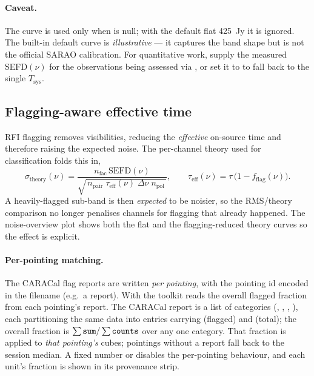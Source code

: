 \documentclass[11pt,a4paper]{article}
\begin{document}
\paragraph{Caveat.} The curve is used only when  is null; with the
default flat \SI{425}{Jy} it is ignored. The built-in default curve is \emph{illustrative} ---
it captures the band shape but is not the official SARAO calibration. For
quantitative work, supply the measured SEFD$(\nu)$ for the observations being assessed via
, or set it to  to fall back to the single
$T_{\mathrm{sys}}$.

\subsection{Flagging-aware effective time}\label{sec:flagaware}
RFI flagging removes visibilities, reducing the \emph{effective} on-source time
and therefore raising the expected noise. The per-channel theory used for
classification folds this in,
\begin{equation}
  \sigma_{\mathrm{theory}}(\nu) =
  \frac{n_{\mathrm{fac}}\,\mathrm{SEFD}(\nu)}
       {\sqrt{\,n_{\mathrm{pair}}\;\tau_{\mathrm{eff}}(\nu)\;\Delta\nu\;n_{\mathrm{pol}}\,}},
  \qquad
  \tau_{\mathrm{eff}}(\nu) = \tau\,\bigl(1 - f_{\mathrm{flag}}(\nu)\bigr).
  \label{eq:theoryflag}
\end{equation}
A heavily-flagged sub-band is then \emph{expected} to be noisier, so the
RMS/theory comparison no longer penalises channels for flagging that already
happened. The noise-overview plot shows both the flat and the flagging-reduced
theory curves so the effect is explicit.

\paragraph{Per-pointing matching.} The CARACal flag reports are written
\emph{per pointing}, with the pointing id encoded in the filename (e.g.\ a
  report). With  the
toolkit reads the overall flagged fraction from each pointing's
 report. The CARACal report is a  list of
categories (, , , ), each
partitioning the same data into entries carrying  (flagged) and
 (total); the overall fraction is
$\sum\texttt{sum}/\sum\texttt{counts}$ over any one category. That fraction is
applied to \emph{that pointing's} cubes; pointings without a report fall back to
the session median. A fixed number or  disables the per-pointing behaviour, and
each unit's fraction is shown in its provenance strip.
\end{document}
